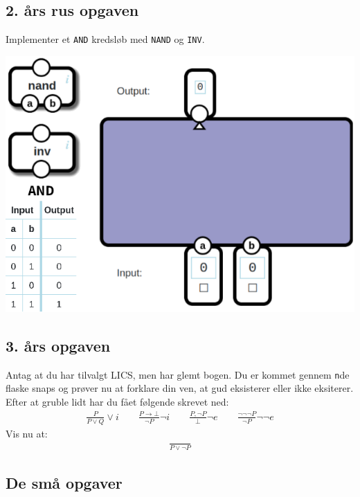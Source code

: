 \subsection{2. års rus opgaven}
\vspace*{-.1cm}
Implementer et \verb|AND| kredsløb med \verb|NAND| og \verb|INV|.\\
\vspace*{-.75cm}
\begin{center}
\includegraphics[width=1\textwidth]{figures/compsys.png}
\end{center}

\subsection{3. års opgaven}
Antag at du har tilvalgt LICS, men har glemt bogen. Du er kommet gennem
\verb|n|de flaske snaps og prøver nu at forklare din ven, at gud
eksisterer eller ikke eksiterer. Efter at gruble lidt har du fået følgende
skrevet ned:
\begin{align*}
    \frac{P}{P\vee Q}\vee i
    \quad\quad\frac{P\rightarrow \bot}{\neg P}\neg i
    \quad\quad\frac{P,\neg P}{\bot}\neg e
    \quad\quad\frac{\neg\neg\neg P}{\neg P}\neg\neg e
\end{align*}
Vis nu at:
\begin{align*}
   \frac{}{P \vee \neg P}
\end{align*}

\subsection{De små opgaver}
\vspace{-0.1cm}

